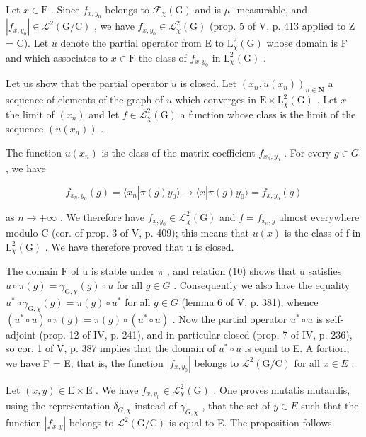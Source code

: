  Let \(x \in \mathrm{F}\) . Since \(f_{x,y_0}\) belongs to \(\mathcal{F}_{\chi}(\mathrm{G})\) and is \(\mu\) -measurable, and \(|f_{x,y_0}| \in \mathcal{L}^2(\mathrm{G/C})\) , we have \(f_{x,y_0} \in \mathcal{L}_{\chi}^2(\mathrm{G})\) (prop. 5 of V, p. 413 applied to Z = C). Let \(u\) denote the partial operator from E to \(\mathrm{L}_{\chi}^{2}(\mathrm{G})\) whose domain is F and which associates to \(x \in \mathrm{F}\) the class of \(f_{x,y_0}\) in \(\mathrm{L}_{\chi}^{2}(\mathrm{G})\) .

 Let us show that the partial operator \(u\) is closed. Let \((x_{n}, u(x_{n}))_{n \in \mathbf{N}}\) a sequence of elements of the graph of \(u\) which converges in \(\mathrm{E} \times \mathrm{L}_{\chi}^{2}(\mathrm{G})\) . Let \(x\) the limit of \((x_{n})\) and let \(f \in \mathcal{L}_{\chi}^{2}(\mathrm{G})\) a function whose class is the limit of the sequence \((u(x_{n}))\) .

The function \(u(x_{n})\) is the class of the matrix coefficient \(f_{x_{n},y_{0}}\) . For every \(g \in G\) , we have

\[
f _ {x _ {n}, y _ {0}} (g) = \langle x _ {n} | \pi (g) y _ {0} \rangle \rightarrow \langle x | \pi (g) y _ {0} \rangle = f _ {x, y _ {0}} (g)
\]

as \(n \to +\infty\) . We therefore have \(f_{x,y_{0}} \in \mathcal{L}_{\chi}^{2}(\mathrm{G})\) and \(f = f_{x_{0},y}\) almost everywhere modulo C (cor. of prop. 3 of V, p. 409); this means that \(u(x)\) is the class of f in \(\mathrm{L}_{\chi}^{2}(\mathrm{G})\) . We have therefore proved that u is closed.

The domain F of u is stable under \(\pi\) , and relation (10) shows that u satisfies \(u \circ \pi(g) = \gamma_{\mathrm{G},\chi}(g) \circ u\) for all \(g \in G\) . Consequently we also have the equality \(u^{*} \circ \gamma_{\mathrm{G},\chi}(g) = \pi(g) \circ u^{*}\) for all \(g \in G\) (lemma 6 of V, p. 381), whence \((u^{*} \circ u) \circ \pi(g) = \pi(g) \circ (u^{*} \circ u)\) . Now the partial operator \(u^{*} \circ u\) is self-adjoint (prop. 12 of IV, p. 241), and in particular closed (prop. 7 of IV, p. 236), so cor. 1 of V, p. 387 implies that the domain of \(u^{*} \circ u\) is equal to E. A fortiori, we have F = E, that is, the function \(|f_{x,y_{0}}|\) belongs to \(\mathcal{L}^{2}(\mathrm{G}/\mathrm{C})\) for all \(x \in E\) .

Let \((x,y)\in\mathrm{E}\times\mathrm{E}\) . We have \(f_{x,y_{0}}\in\mathcal{L}_{\chi}^{2}(\mathrm{G})\) . One proves mutatis mutandis, using the representation \(\delta_{G,\chi}\) instead of \(\gamma_{G,\chi}\) , that the set of \(y\in E\) such that the function \(|f_{x,y}|\) belongs to \(\mathcal{L}^{2}(\mathrm{G}/\mathrm{C})\) is equal to E. The proposition follows.

